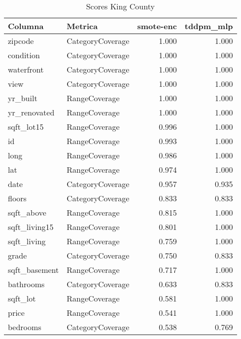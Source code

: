 \begin{table}[H]
\centering
\caption{Scores King County}
\label{table-coverage-king county-a-3}
\begin{tabular}{|l|l|r|r|}
\hline
\rowcolor[gray]{0.8}
Columna & Metrica & smote-enc & tddpm\_mlp \\
\hline zipcode & CategoryCoverage & \cellcolor[HTML]{EEEEEE} 1.000 & \cellcolor[HTML]{EEEEEE} 1.000 \\
\hline condition & CategoryCoverage & \cellcolor[HTML]{EEEEEE} 1.000 & \cellcolor[HTML]{EEEEEE} 1.000 \\
\hline waterfront & CategoryCoverage & \cellcolor[HTML]{EEEEEE} 1.000 & \cellcolor[HTML]{EEEEEE} 1.000 \\
\hline view & CategoryCoverage & \cellcolor[HTML]{EEEEEE} 1.000 & \cellcolor[HTML]{EEEEEE} 1.000 \\
\hline yr\_built & RangeCoverage & 1.000 & \cellcolor[HTML]{EEEEEE} 1.000 \\
\hline yr\_renovated & RangeCoverage & 1.000 & \cellcolor[HTML]{EEEEEE} 1.000 \\
\hline sqft\_lot15 & RangeCoverage & 0.996 & \cellcolor[HTML]{EEEEEE} 1.000 \\
\hline id & RangeCoverage & 0.993 & \cellcolor[HTML]{EEEEEE} 1.000 \\
\hline long & RangeCoverage & 0.986 & \cellcolor[HTML]{EEEEEE} 1.000 \\
\hline lat & RangeCoverage & 0.974 & \cellcolor[HTML]{EEEEEE} 1.000 \\
\hline date & CategoryCoverage & \cellcolor[HTML]{EEEEEE} 0.957 & 0.935 \\
\hline floors & CategoryCoverage & \cellcolor[HTML]{EEEEEE} 0.833 & \cellcolor[HTML]{EEEEEE} 0.833 \\
\hline sqft\_above & RangeCoverage & 0.815 & \cellcolor[HTML]{EEEEEE} 1.000 \\
\hline sqft\_living15 & RangeCoverage & 0.801 & \cellcolor[HTML]{EEEEEE} 1.000 \\
\hline sqft\_living & RangeCoverage & 0.759 & \cellcolor[HTML]{EEEEEE} 1.000 \\
\hline grade & CategoryCoverage & 0.750 & \cellcolor[HTML]{EEEEEE} 0.833 \\
\hline sqft\_basement & RangeCoverage & 0.717 & \cellcolor[HTML]{EEEEEE} 1.000 \\
\hline bathrooms & CategoryCoverage & 0.633 & \cellcolor[HTML]{EEEEEE} 0.833 \\
\hline sqft\_lot & RangeCoverage & 0.581 & \cellcolor[HTML]{EEEEEE} 1.000 \\
\hline price & RangeCoverage & 0.541 & \cellcolor[HTML]{EEEEEE} 1.000 \\
\hline bedrooms & CategoryCoverage & 0.538 & \cellcolor[HTML]{EEEEEE} 0.769 \\
\hline
\end{tabular}
\end{table}
